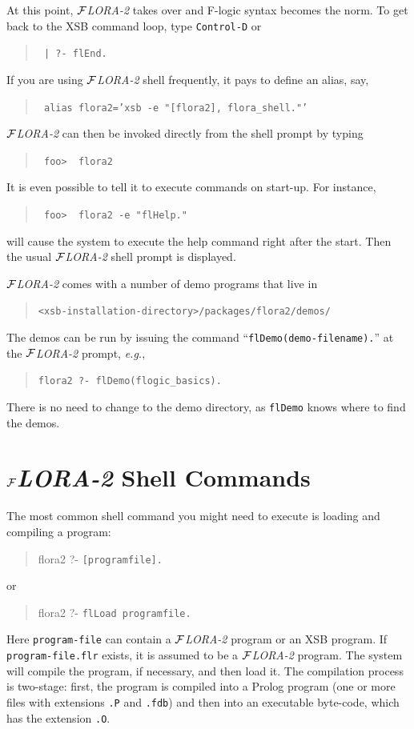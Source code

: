 \documentclass[11pt]{article}
\newcommand{\FLORA}{{\mbox{${\cal F}${\small\it LORA}\rm\emph{-2}}}\xspace}
\newcommand{\fl}{\mbox{F-logic}\xspace}
\begin{document}
At this point, \FLORA takes over and \fl syntax becomes the
norm. To get back to the XSB command loop, type {\tt Control-D} or 
\begin{quote}
  \tt
| ?- flEnd.  
\end{quote}

If you are using \FLORA shell frequently, it pays to define an alias, say,
\begin{quote}
 {\tt
   alias flora2='xsb -e "[flora2], flora\_shell."'
   }
\end{quote}
\FLORA can then be invoked directly from the shell prompt by typing
\begin{quote}
  \tt
foo>~~flora2
\end{quote}
It is even possible to tell it to execute commands on start-up.
For instance, 
\begin{quote}
 \tt
 foo>~~flora2 -e "flHelp."
\end{quote}
will cause the system to execute the help command right after the start.
Then the usual \FLORA shell prompt is displayed.

\noindent
\FLORA comes with a number of demo programs that live in
\begin{quote}
 \verb|<xsb-installation-directory>/packages/flora2/demos/|  
\end{quote}
The demos can be run by issuing the command
``\verb|flDemo(demo-filename).|''
at the \FLORA prompt, {\it e.g.},
\begin{quote}
 \verb|flora2 ?- flDemo(flogic_basics).|
\end{quote}
There is no need to change to the demo directory, as {\tt flDemo} knows
where to find the demos.


\section{\FLORA Shell Commands} \label{sec-shell-commands}

The most common shell command you might need to execute is loading and
compiling a program:
\begin{quote}
  flora2 ?-  {\tt [programfile].}
\end{quote}
or 
\begin{quote}
  flora2 ?- {\tt flLoad programfile.}
\end{quote}
Here {\tt program-file} can contain a \FLORA program or an XSB program. If
{\tt program-file.flr} exists, it is assumed to be a \FLORA program. The
system will compile the program, if necessary, and then load it. The
compilation process is two-stage: first, the program is compiled into a
Prolog program (one or more files with extensions {\tt .P} and {\tt .fdb})
and then into an executable byte-code, which has the extension {\tt .O}.
\end{document}
